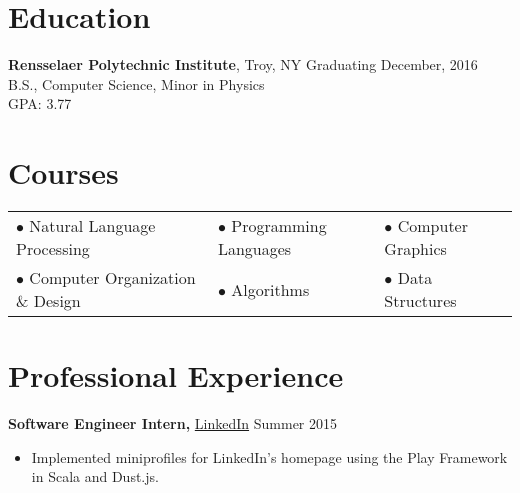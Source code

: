 \documentclass[margin]{res}
\begin{document}
 
\begin{minipage}{\textwidth}

 
\begin{resume} 
 
\section{Education} 
{\bf Rensselaer Polytechnic Institute}, Troy, NY \hfill Graduating December, 2016 \\
B.S., Computer Science, Minor in Physics \\
GPA: 3.77
 
\section{Courses}
\begin{tabular}{lll}
$\bullet$ Natural Language Processing & $\bullet$ Programming Languages & $\bullet$ Computer Graphics \\
$\bullet$ Computer Organization \& Design & $\bullet$ Algorithms & $\bullet$ Data Structures \\
\end{tabular}

\section{Professional Experience}
{\bf Software Engineer Intern,} \uline{LinkedIn} \hfill Summer 2015
 \begin{itemize} \itemsep -2pt %
 \item Implemented miniprofiles for LinkedIn's homepage using the Play Framework in Scala and Dust.js.
 \end{itemize}




\end{resume}
\end{minipage}
\end{document}

